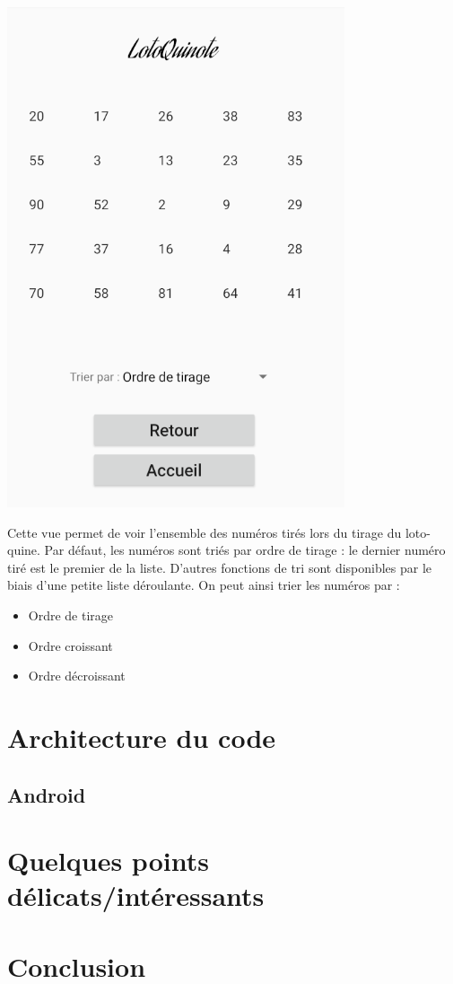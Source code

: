 \documentclass{article}
\begin{document}
    \begin{minipage}{.35\textwidth}%
        \includegraphics[scale=0.6]{liste.png}
    \end{minipage}%
    \hfill
    \begin{minipage}{.6\textwidth}%
    Cette vue permet de voir l'ensemble des numéros tirés lors du tirage du loto-quine. Par défaut, les numéros sont triés par ordre de tirage : le dernier numéro tiré est le premier de la liste.
    \vspace{1em}
    \newline
    D'autres fonctions de tri sont disponibles par le biais d'une petite liste déroulante. On peut ainsi trier les numéros par :
    \begin{itemize}
        \item Ordre de tirage
        \item Ordre croissant
        \item Ordre décroissant
    \end{itemize}
    \end{minipage}%
    
    
    


\section{Architecture du code}

\subsection{Android}

\section{Quelques points délicats/intéressants}

\section{Conclusion}

\begin{thebibliography}{}
\bibitem{}

\end{thebibliography}
\end{document}
